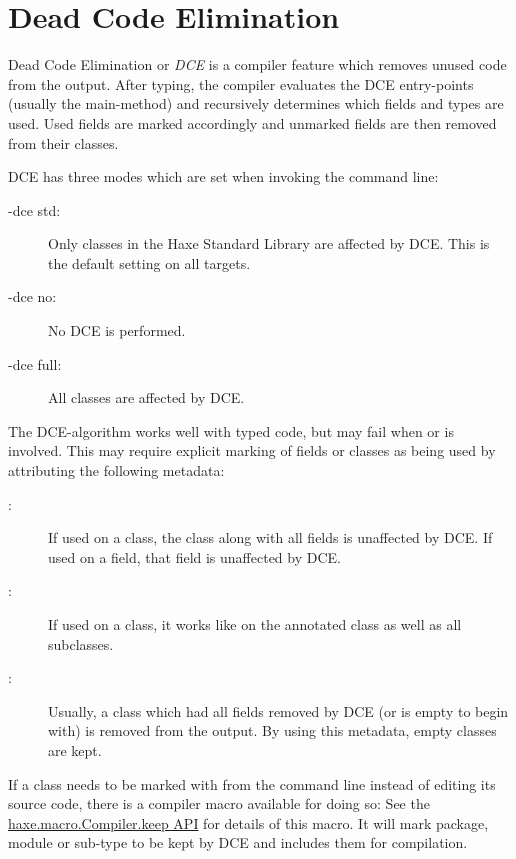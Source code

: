\section{Dead Code Elimination}
\label{cr-dce}

Dead Code Elimination or \emph{DCE} is a compiler feature which removes unused code from the output. After typing, the compiler evaluates the DCE entry-points (usually the main-method) and recursively determines which fields and types are used. Used fields are marked accordingly and unmarked fields are then removed from their classes.

DCE has three modes which are set when invoking the command line:

\begin{description}
	\item[-dce std:] Only classes in the Haxe Standard Library are affected by DCE. This is the default setting on all targets.
	\item[-dce no:] No DCE is performed.
	\item[-dce full:] All classes are affected by DCE.
\end{description}
The DCE-algorithm works well with typed code, but may fail when  or  is involved. This may require explicit marking of fields or classes as being used by attributing the following metadata:

\begin{description}
	\item[:] If used on a class, the class along with all fields is unaffected by DCE. If used on a field, that field is unaffected by DCE.
	\item[:] If used on a class, it works like  on the annotated class as well as all subclasses.
	\item[:] Usually, a class which had all fields removed by DCE (or is empty to begin with) is removed from the output. By using this metadata, empty classes are kept.
\end{description}

If a class needs to be marked with  from the command line instead of editing its source code, there is a compiler macro available for doing so:  See the \href{http://api.haxe.org/haxe/macro/Compiler.html#keep}{haxe.macro.Compiler.keep API} for details of this macro. It will mark package, module or sub-type to be kept by DCE and includes them for compilation.
 
